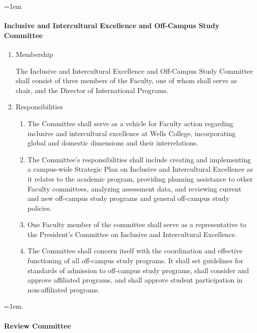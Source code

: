 \documentclass{manual}
\let\oldparagraph\paragraph
\renewcommand\paragraph{\leftskip=1em\oldparagraph}
\newcommand{\itemLevelA}{\alph*.}
\newcommand{\itemLevelB}{\arabic*)}
\newcommand{\itemRefA}{\alph*}
\newcommand{\itemRefB}{\arabic*}
\begin{document}
			\paragraph{Inclusive and Intercultural Excellence and Off-Campus Study Committee}

				\begin{enumerate}[label=\itemLevelA,ref=\itemRefA]
				\item Membership

					The Inclusive and Intercultural Excellence and Off-Campus Study Committee shall consist of three members of the Faculty, one of whom shall serve as chair, and the Director of International Programs.

				\item Responsibilities

					\begin{enumerate}[label=\itemLevelB,ref=\itemRefB]
					\item The Committee shall serve as a vehicle for Faculty action regarding inclusive and intercultural excellence at Wells College, incorporating global and domestic dimensions and their interrelations.
					\item The Committee's responsibilities shall include creating and implementing a campus-wide Strategic Plan on Inclusive and Intercultural Excellence as it relates to the academic program, providing planning assistance to other Faculty committees, analyzing assessment data, and reviewing current and new off-campus study programs and general off-campus study policies.
					\item One Faculty member of the committee shall serve as a representative to the President's Committee on Inclusive and Intercultural Excellence.
					\item The Committee shall concern itself with the coordination and effective functioning of all off-campus study programs. It shall set guidelines for standards of admission to off-campus study programs, shall consider and approve affiliated programs, and shall approve student participation in non-affiliated programs.
					\end{enumerate}
				
				\end{enumerate}

			\paragraph{Review Committee}\label{par:ReviewCommittee}
\end{document}

